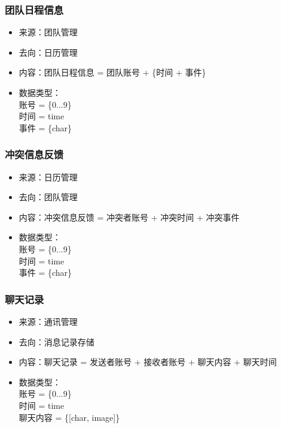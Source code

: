             \subsubsection{团队日程信息}
            \begin{itemize}
            \item 来源：团队管理
            \item 去向：日历管理
            \item 内容：团队日程信息 = 团队账号 + \{时间 + 事件\}
            \item 数据类型：\\
            账号 = \{0...9\}\\
            时间 = time\\
            事件 = \{char\}\\
            \end{itemize}

            \subsubsection{冲突信息反馈}
            \begin{itemize}
            \item 来源：日历管理
            \item 去向：团队管理
            \item 内容：冲突信息反馈 = {冲突者账号 + 冲突时间 + 冲突事件}
            \item 数据类型：\\
            账号 = \{0...9\}\\
            时间 = time\\
            事件 = \{char\}\\
            \end{itemize}
            \subsubsection{聊天记录}
            \begin{itemize}
            \item 来源：通讯管理
            \item 去向：消息记录存储
            \item 内容：聊天记录 = 发送者账号 + 接收者账号 + 聊天内容 + 聊天时间
            \item 数据类型：\\
            账号 = \{0...9\}\\
            时间 = time\\
            聊天内容 = \{[char, image]\}\\
            \end{itemize}

